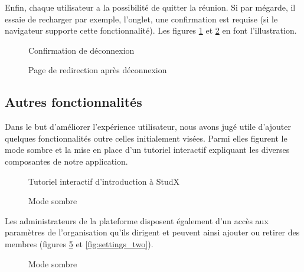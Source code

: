 Enfin, chaque utilisateur a la possibilité de quitter la réunion. Si par mégarde, il essaie de recharger par exemple, l’onglet, une confirmation est requise (si le navigateur supporte cette fonctionnalité). 
Les figures \ref{fig:confirm_exit} et \ref{fig:exited} en font l'illustration.


\begin{figure}[h]
  \centering
  \caption{Confirmation de déconnexion}
  \label{fig:confirm_exit}
\end{figure}


\begin{figure}[h]
  \centering
  \caption{Page de redirection après déconnexion}
  \label{fig:exited}
\end{figure}

\subsection{Autres fonctionnalités}
Dans le but d'améliorer l'expérience utilisateur, nous avons jugé utile d’ajouter quelques fonctionnalités outre celles initialement visées. 
Parmi elles figurent le mode sombre et la mise en place d’un tutoriel interactif expliquant les diverses composantes de notre application. 

\begin{figure}[h]
  \centering
  \caption{Tutoriel interactif d’introduction à StudX}
  \label{fig:onboarding}
\end{figure}


\begin{figure}[h]
  \centering
  \caption{Mode sombre}
  \label{fig:dark_mode}
\end{figure}

Les administrateurs de la plateforme disposent également d’un accès aux paramètres de 
l'organisation qu’ils dirigent et peuvent ainsi ajouter ou retirer des membres (figures \ref{fig:settings_one} et \ref{fig:settings_two}).

\begin{figure}[h]
  \centering
  \caption{Mode sombre}
  \label{fig:settings_one}
\end{figure}


